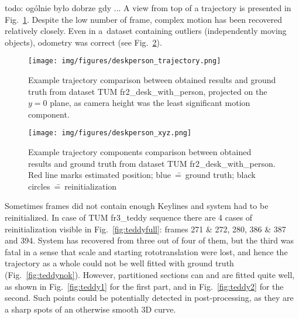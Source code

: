 todo: ogólnie było dobrze gdy ... A view from top of a trajectory is presented in Fig.~\ref{fig:traject}. Despite the low number of frame, complex motion has been recovered relatively closely. Even in a~dataset containing outliers (independently moving objects), odometry was correct (see Fig.~\ref{fig:trajectxyz}).

\begin{figure}[ht]
	\centering\texttt{[image: img/figures/deskperson\_trajectory.png]}
	\caption{ Example trajectory comparison between obtained results and ground truth from dataset TUM fr2\_desk\_with\_person, projected on the $y=0$ plane, as camera height was the least significant motion component. }
	\label{fig:traject}
\end{figure}

\begin{figure}[ht]
	\centering\texttt{[image: img/figures/deskperson\_xyz.png]}
	\caption{ Example trajectory components comparison between obtained results and ground truth from dataset TUM fr2\_desk\_with\_person. Red line marks estimated position; blue~\==~ground truth; black circles~\==~reinitialization }
	\label{fig:trajectxyz}
\end{figure}

Sometimes frames did not contain enough Keylines and system had to be reinitialized. In case of TUM fr3\_teddy sequence there are 4 cases of reinitialization visible in Fig.~\ref{fig:teddyfull}: frames 271 \& 272, 280, 386 \& 387 and 394. System has recovered from three out of four of them, but the third was fatal in a sense that scale and starting rototranslation were lost, and hence the trajectory as a whole could not be well fitted with ground truth (Fig.~\ref{fig:teddynok}). However, partitioned sections can and are fitted quite well, as shown in Fig.~\ref{fig:teddy1} for the first part, and in Fig.~\ref{fig:teddy2} for the second. Such points could be potentially detected in post-processing, as they are a sharp spots of an otherwise smooth 3D curve.

